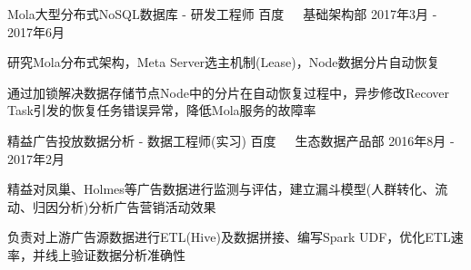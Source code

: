 \documentclass[11pt, a4paper, UTF8]{awesome-cv}
\begin{document}
\begin{cventries}
  \cventry
    {Mola大型分布式NoSQL数据库 - 研发工程师} %
    {百度{\ \cdotp\ \ }基础架构部} %
    {2017年3月 - 2017年6月} %
    {\ } %
    {
      \begin{cvitems} %
        \item {研究Mola分布式架构，Meta Server选主机制(Lease)，Node数据分片自动恢复}
        \item {通过加锁解决数据存储节点Node中的分片在自动恢复过程中，异步修改Recover Task引发的恢复任务错误异常，降低Mola服务的故障率}
      \end{cvitems}
    }

  \cventry
    {精益广告投放数据分析 - 数据工程师(实习)} %
    {百度{\ \cdotp\ \ }生态数据产品部} %
    {2016年8月 - 2017年2月} %
    {\ } %
    {
      \begin{cvitems} %
        \item {精益对凤巢、Holmes等广告数据进行监测与评估，建立漏斗模型(人群转化、流动、归因分析)分析广告营销活动效果}
        \item {负责对上游广告源数据进行ETL(Hive)及数据拼接、编写Spark UDF，优化ETL速率，并线上验证数据分析准确性}
      \end{cvitems}
    }
        
\end{cventries}
\end{document}
